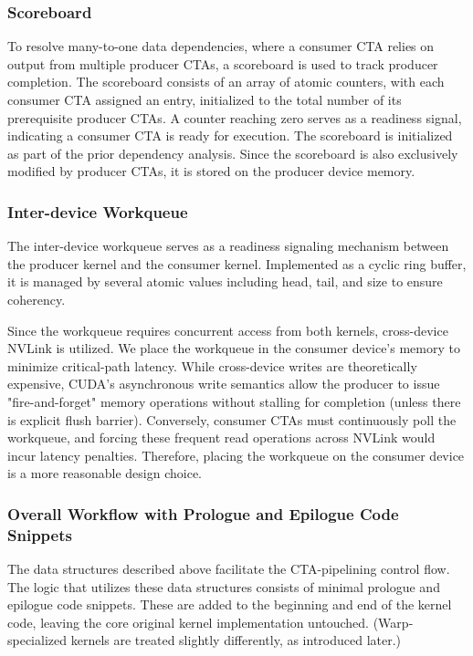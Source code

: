 \subsubsection{Scoreboard}
To resolve many-to-one data dependencies, where a consumer CTA relies on output from multiple producer CTAs, a scoreboard is used to track producer completion. The scoreboard consists of an array of atomic counters, with each consumer CTA assigned an entry,  initialized to the total number of its prerequisite producer CTAs. A counter reaching zero serves as a readiness signal, indicating a consumer CTA is ready for execution. The scoreboard is initialized as part of the prior dependency analysis. Since the scoreboard is also exclusively modified by producer CTAs, it is stored on the producer device memory.

\subsubsection{Inter-device Workqueue}
The inter-device workqueue serves as a readiness signaling mechanism between the producer kernel and the consumer kernel. Implemented as a cyclic ring buffer, it is managed by several atomic values including head, tail, and size to ensure coherency. 

Since the workqueue requires concurrent access from both kernels, cross-device NVLink is utilized. We place the workqueue in the consumer device's memory to minimize critical-path latency. While cross-device writes are theoretically expensive, CUDA's asynchronous write semantics allow the producer to issue "fire-and-forget" memory operations without stalling for completion (unless there is explicit flush barrier). Conversely, consumer CTAs must continuously poll the workqueue, and forcing these frequent read operations across NVLink would incur latency penalties. Therefore, placing the workqueue on the consumer device is a more reasonable design choice.

\subsubsection{Overall Workflow with Prologue and Epilogue Code Snippets}

The data structures described above facilitate the CTA-pipelining control flow. The logic that utilizes these data structures consists of minimal prologue and epilogue code snippets. These are added to the beginning and end of the kernel code, leaving the core original kernel implementation untouched. (Warp-specialized kernels are treated slightly differently, as introduced later.)

